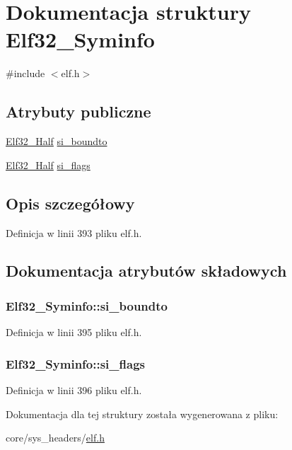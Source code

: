 \hypertarget{struct_elf32___syminfo}{\section{Dokumentacja struktury Elf32\-\_\-\-Syminfo}
\label{struct_elf32___syminfo}
}


{\ttfamily \#include $<$elf.\-h$>$}

\subsection*{Atrybuty publiczne}
\begin{DoxyCompactItemize}
\item 
\hyperlink{elf_8h_a2ff0787d7d1bae0f251192806a2974ca}{Elf32\-\_\-\-Half} \hyperlink{struct_elf32___syminfo_a9d321c4cc96a0324a9b2dbe98bca2bd9}{si\-\_\-boundto}
\item 
\hyperlink{elf_8h_a2ff0787d7d1bae0f251192806a2974ca}{Elf32\-\_\-\-Half} \hyperlink{struct_elf32___syminfo_a3c3931c5ff4c0681e1511987ea83649e}{si\-\_\-flags}
\end{DoxyCompactItemize}


\subsection{Opis szczegółowy}


Definicja w linii 393 pliku elf.\-h.



\subsection{Dokumentacja atrybutów składowych}
\hypertarget{struct_elf32___syminfo_a9d321c4cc96a0324a9b2dbe98bca2bd9}{
\subsubsection[{si\-\_\-boundto}]{ Elf32\-\_\-\-Syminfo\-::si\-\_\-boundto}}\label{struct_elf32___syminfo_a9d321c4cc96a0324a9b2dbe98bca2bd9}


Definicja w linii 395 pliku elf.\-h.

\hypertarget{struct_elf32___syminfo_a3c3931c5ff4c0681e1511987ea83649e}{
\subsubsection[{si\-\_\-flags}]{ Elf32\-\_\-\-Syminfo\-::si\-\_\-flags}}\label{struct_elf32___syminfo_a3c3931c5ff4c0681e1511987ea83649e}


Definicja w linii 396 pliku elf.\-h.



Dokumentacja dla tej struktury została wygenerowana z pliku\-:\begin{DoxyCompactItemize}
\item 
core/sys\-\_\-headers/\hyperlink{elf_8h}{elf.\-h}\end{DoxyCompactItemize}
